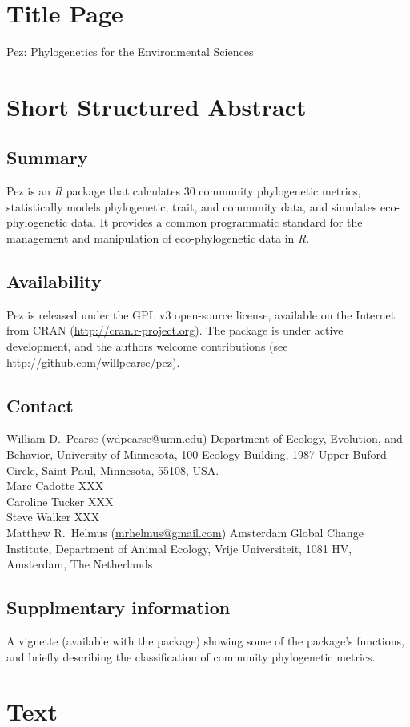 \documentclass[11pt]{article} %
\begin{document}
\section*{Title Page}
Pez: Phylogenetics for the Environmental Sciences
\section*{Short Structured Abstract}
\subsection*{Summary}
Pez is an \emph{R} package that calculates 30 community phylogenetic
metrics, statistically models phylogenetic, trait, and community data,
and simulates eco-phylogenetic data. It provides a common programmatic
standard for the management and manipulation of eco-phylogenetic data
in \emph{R}.
\subsection*{Availability}
Pez is released under the GPL v3 open-source license, available on the
Internet from CRAN (\url{http://cran.r-project.org}). The package is
under active development, and the authors welcome contributions (see
\url{http://github.com/willpearse/pez}).
\subsection*{Contact}
William D.\ Pearse (\url{wdpearse@umn.edu}) Department of Ecology, Evolution, and Behavior, University of Minnesota, 100 Ecology Building, 1987 Upper Buford Circle, Saint Paul, Minnesota, 55108, USA.
\\Marc Cadotte XXX
\\Caroline Tucker XXX
\\Steve Walker XXX
\\Matthew R.\ Helmus (\url{mrhelmus@gmail.com}) Amsterdam Global Change Institute, Department of Animal Ecology, Vrije Universiteit, 1081 HV, Amsterdam, The Netherlands
\subsection*{Supplmentary information}
A vignette (available with the package) showing some of the package's
functions, and briefly describing the classification of community
phylogenetic metrics.
\section*{Text}
\end{document}
